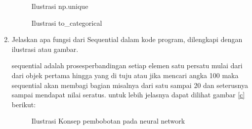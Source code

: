 \begin{enumerate}
\begin{figure}[!htbp]
      \caption{Ilustrasi  np.unique}
      \label{c119}
      \end{figure}

\begin{figure}[!htbp]
      \caption{Ilustrasi to\_categorical}
      \label{c120}
      \end{figure}

\item Jelaskan apa fungsi dari Sequential dalam kode program, dilengkapi dengan ilustrasi atau gambar. \par
sequential adalah prosesperbandingan setiap elemen satu persatu mulai dari dari objek pertama hingga yang di tuju atau jika mencari angka 100 maka sequential akan membagi bagian misalnya dari satu sampai 20 dan seterusnya sampai mendapat nilai seratus. untuk lebih jelasnya dapat dilihat gambar \ref{c}  berikut:

\begin{figure}[!htbp]
      \caption{Ilustrasi Konsep pembobotan pada neural network}
      \label{c121}
      \end{figure}
\end{enumerate}

